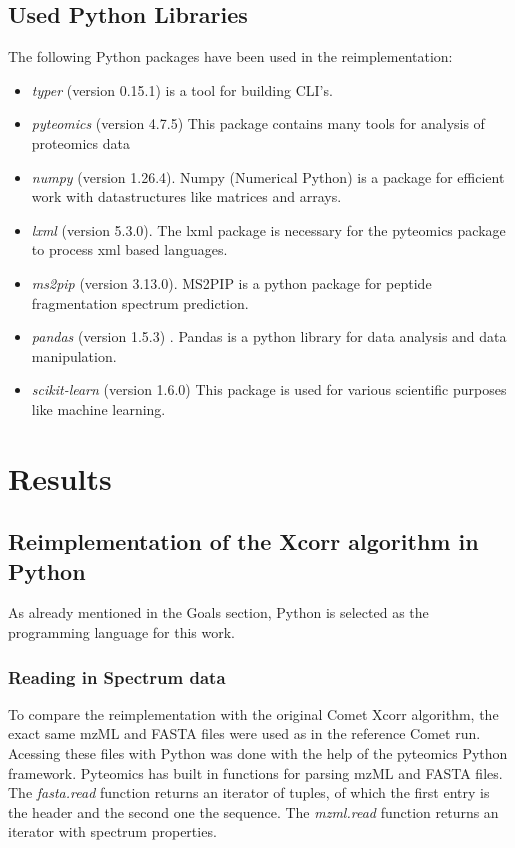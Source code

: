\documentclass[11pt]{article}
\begin{document}
\subsection{Used Python Libraries}
The following Python packages have been used in the reimplementation:
\begin{itemize}
    \item \textit{typer} (version 0.15.1) is a tool for building CLI's.
    \item \textit{pyteomics} (version 4.7.5) This package contains many tools for analysis of proteomics data \cite{pyteomics, pyteomics-five-years}
    \item \textit{numpy} (version 1.26.4). Numpy (Numerical Python) is a package for efficient work with datastructures like matrices and arrays.
    \item \textit{lxml} (version 5.3.0). The lxml package is necessary for the pyteomics package to process xml based languages.
    \item \textit{ms2pip} (version 3.13.0). MS2PIP is a python package for peptide fragmentation spectrum prediction.
    \item \textit{pandas} (version 1.5.3) . Pandas is a python library for data analysis and data manipulation.
    \item \textit{scikit-learn} (version 1.6.0) This package is used for various scientific purposes like machine learning.
\end{itemize}

\newpage

\section{Results}

\subsection{Reimplementation of the Xcorr algorithm in Python}
As already mentioned in the Goals section, Python is selected as the programming language for this work.

\subsubsection{Reading in Spectrum data}
To compare the reimplementation with the original Comet Xcorr algorithm, the exact same mzML and FASTA files were used as in the reference Comet run. Acessing these files with Python was done with the help of the pyteomics Python framework. Pyteomics has built in functions for parsing mzML and FASTA files. The \textit{fasta.read} function returns an iterator of tuples, of which the first entry is the header and the second one the sequence. The \textit{mzml.read} function returns an iterator with spectrum properties.
\end{document}
